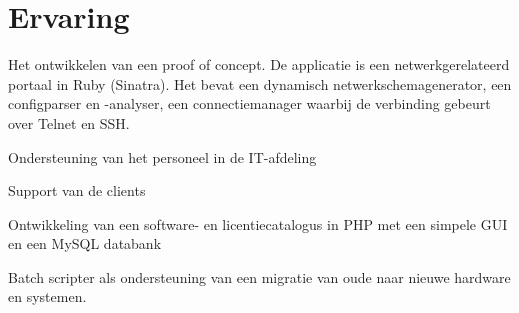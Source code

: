 \documentclass[a4paper]{deedy-resume} %
\begin{document}
\hfill
%
%
\begin{minipage}[t]{0.60\textwidth} %


\section{Ervaring}


\vspace{\topsep} %
\begin{tightitemize}
\item Het ontwikkelen van een proof of concept. De applicatie is een netwerkgerelateerd portaal in Ruby (Sinatra). Het bevat een dynamisch netwerkschemagenerator, een configparser en -analyser, een connectiemanager waarbij de verbinding gebeurt over Telnet en SSH.
\end{tightitemize}

\sectionspace %



\begin{tightitemize}
\item Ondersteuning van het personeel in de IT-afdeling
\item Support van de clients
\item Ontwikkeling van een software- en licentiecatalogus in PHP met een simpele GUI en een MySQL databank
\item Batch scripter als ondersteuning van een migratie van oude naar nieuwe hardware en systemen.
\end{tightitemize}

\sectionspace %



\end{minipage}
\end{document}
